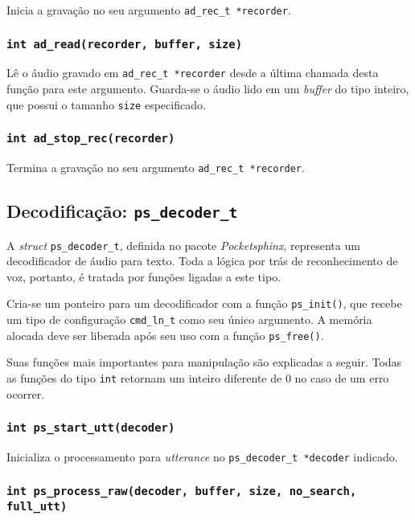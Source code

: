Inicia a gravação no seu argumento \texttt{ad\_rec\_t *recorder}.

\subsubsection{\texttt{int ad\_read(recorder, buffer, size)}}

Lê o áudio gravado em \texttt{ad\_rec\_t *recorder} desde a última chamada desta função para este argumento. Guarda-se o áudio lido em um \textit{buffer} do tipo inteiro, que possui o tamanho \texttt{size} especificado.

\subsubsection{\texttt{int ad\_stop\_rec(recorder)}}

Termina a gravação no seu argumento \texttt{ad\_rec\_t *recorder}.


\subsection{Decodificação: \texttt{ps\_decoder\_t}}

A \textit{struct} \texttt{ps\_decoder\_t}, definida no pacote \textit{Pocketsphinx}, representa um decodificador de áudio para texto. Toda a lógica por trás de reconhecimento de voz, portanto, é tratada por funções ligadas a este tipo.

Cria-se um ponteiro para um decodificador com a função \texttt{ps\_init()}, que recebe um tipo de configuração \texttt{cmd\_ln\_t} como seu único argumento. A memória alocada deve ser liberada após seu uso com a função \texttt{ps\_free()}.

Suas funções mais importantes para manipulação são explicadas a seguir. Todas as funções do tipo \texttt{int} retornam um inteiro diferente de 0 no caso de um erro ocorrer.

\subsubsection{\texttt{int ps\_start\_utt(decoder)}}

Inicializa o processamento para \textit{utterance} no \texttt{ps\_decoder\_t *decoder} indicado.

\subsubsection{\texttt{int ps\_process\_raw(decoder, buffer, size, no\_search, full\_utt)}}

